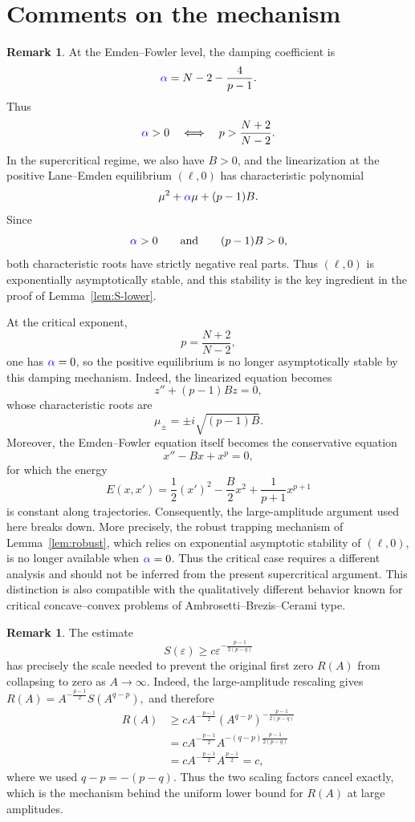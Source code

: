 \documentclass[11pt]{article}
\newcommand{\add}[1]{{\color{blue}#1}}
\newcommand{\oldrev}[1]{#1}
\newcommand{\damp}{\add{\alpha}}            %
\theoremstyle{definition}
\newtheorem{remark}[theorem]{Remark}
\begin{document}
  
\section{Comments on the mechanism}
\begin{remark}
At the Emden--Fowler level, the damping coefficient is
\[
\damp
=
N-2-\frac4{p-1}.
\]
Thus
\[
\damp>0
\quad\Longleftrightarrow\quad
p>\frac{N+2}{N-2}.
\]
In the supercritical regime, we also have $B>0$, and the
linearization at the positive Lane--Emden equilibrium $(\ell,0)$
has characteristic polynomial
\[
\mu^2+\damp\mu+(p-1)B.
\]
Since
\[
\damp>0
\qquad\text{and}\qquad
(p-1)B>0,
\]
both characteristic roots have strictly negative real parts.
Thus $(\ell,0)$ is exponentially asymptotically stable, and this
stability is the key ingredient in the proof of
Lemma~\ref{lem:S-lower}.

At the critical exponent,
\[
p=\frac{N+2}{N-2},
\]
one has $\damp=0$, so the positive equilibrium is no longer
asymptotically stable by this damping mechanism.
\oldrev{Indeed, the linearized equation becomes
\[
z''+(p-1)Bz=0,
\]
whose characteristic roots are
\[
\mu_\pm=\pm i\sqrt{(p-1)B}.
\]
Moreover, the Emden--Fowler equation itself becomes the conservative
equation
\[
x''-Bx+x^p=0,
\]
for which the energy
\[
E(x,x')
=
\frac12(x')^2-\frac{B}{2}x^2+\frac1{p+1}x^{p+1}
\]
is constant along trajectories.}
Consequently, the
large-amplitude argument used here breaks down.
\oldrev{More precisely, the robust trapping mechanism of
Lemma~\ref{lem:robust}, which relies on exponential asymptotic
stability of $(\ell,0)$, is no longer available when $\damp=0$.
Thus the critical case requires a different analysis and should not
be inferred from the present supercritical argument. This distinction
is also compatible with the qualitatively different behavior known
for critical concave--convex problems of
Ambrosetti--Brezis--Cerami type.}
\end{remark}

\begin{remark}
The estimate
\[
S(\varepsilon)
\geq
c\varepsilon^{-\frac{p-1}{2(p-q)}}
\]
has precisely the scale needed to prevent the original first zero
$R(A)$ from collapsing to zero as $A\to\infty$. Indeed, the
large-amplitude rescaling gives
\(
R(A)
=
A^{-\frac{p-1}{2}}
S(A^{q-p}),
\)
and therefore
\begin{align*}
R(A)
&\geq
cA^{-\frac{p-1}{2}}
\left(A^{q-p}\right)^{-\frac{p-1}{2(p-q)}}
\\
&=
\oldrev{
cA^{-\frac{p-1}{2}}
A^{-(q-p)\frac{p-1}{2(p-q)}}
}
\\
&=
cA^{-\frac{p-1}{2}}
A^{\frac{p-1}{2}}
=
c,
\end{align*}
\oldrev{where we used $q-p=-(p-q)$.}
Thus the two scaling factors cancel exactly, which is the mechanism
behind the uniform lower bound for $R(A)$ at large amplitudes.
\end{remark}
    
\end{document}
